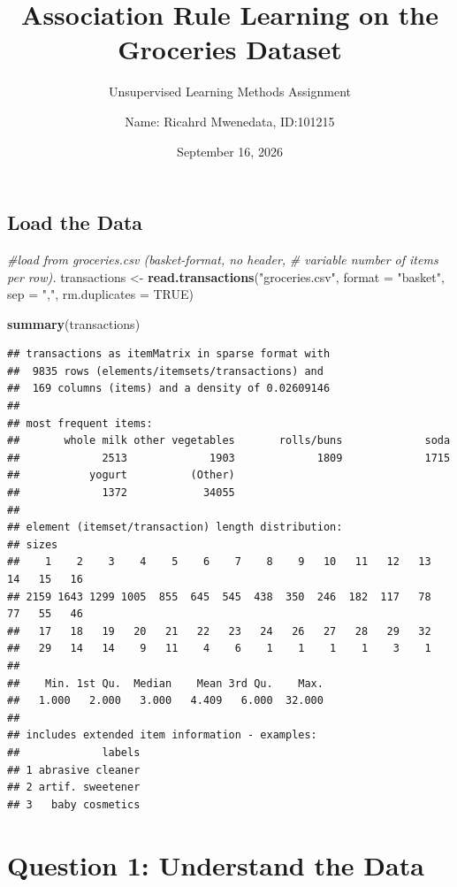 \documentclass[
]{article}
\title{Association Rule Learning on the Groceries Dataset}
\subtitle{Unsupervised Learning Methods Assignment}
\author{Name: Ricahrd Mwenedata, ID:101215}
\date{September 16, 2026}
\newenvironment{Shaded}{\begin{snugshade}}{\end{snugshade}}
\newcommand{\AttributeTok}[1]{\textcolor[rgb]{0.13,0.29,0.53}{#1}}
\newcommand{\CommentTok}[1]{\textcolor[rgb]{0.56,0.35,0.01}{\textit{#1}}}
\newcommand{\ConstantTok}[1]{\textcolor[rgb]{0.56,0.35,0.01}{#1}}
\newcommand{\FunctionTok}[1]{\textcolor[rgb]{0.13,0.29,0.53}{\textbf{#1}}}
\newcommand{\NormalTok}[1]{#1}
\newcommand{\OtherTok}[1]{\textcolor[rgb]{0.56,0.35,0.01}{#1}}
\newcommand{\StringTok}[1]{\textcolor[rgb]{0.31,0.60,0.02}{#1}}
\begin{document}
\maketitle

{
\setcounter{tocdepth}{2}
\tableofcontents
}
\subsection{Load the Data}\label{load-the-data}

\begin{Shaded}
\begin{Highlighting}[]
\CommentTok{\#load from groceries.csv (basket{-}format, no header,}
\CommentTok{\# variable number of items per row).}
\NormalTok{transactions }\OtherTok{\textless{}{-}} \FunctionTok{read.transactions}\NormalTok{(}\StringTok{"groceries.csv"}\NormalTok{, }\AttributeTok{format =} \StringTok{"basket"}\NormalTok{,}
                                   \AttributeTok{sep =} \StringTok{","}\NormalTok{, }\AttributeTok{rm.duplicates =} \ConstantTok{TRUE}\NormalTok{)}

\FunctionTok{summary}\NormalTok{(transactions)}
\end{Highlighting}
\end{Shaded}

\begin{verbatim}
## transactions as itemMatrix in sparse format with
##  9835 rows (elements/itemsets/transactions) and
##  169 columns (items) and a density of 0.02609146 
## 
## most frequent items:
##       whole milk other vegetables       rolls/buns             soda 
##             2513             1903             1809             1715 
##           yogurt          (Other) 
##             1372            34055 
## 
## element (itemset/transaction) length distribution:
## sizes
##    1    2    3    4    5    6    7    8    9   10   11   12   13   14   15   16 
## 2159 1643 1299 1005  855  645  545  438  350  246  182  117   78   77   55   46 
##   17   18   19   20   21   22   23   24   26   27   28   29   32 
##   29   14   14    9   11    4    6    1    1    1    1    3    1 
## 
##    Min. 1st Qu.  Median    Mean 3rd Qu.    Max. 
##   1.000   2.000   3.000   4.409   6.000  32.000 
## 
## includes extended item information - examples:
##             labels
## 1 abrasive cleaner
## 2 artif. sweetener
## 3   baby cosmetics
\end{verbatim}

\section{Question 1: Understand the
Data}\label{question-1-understand-the-data}
\end{document}
